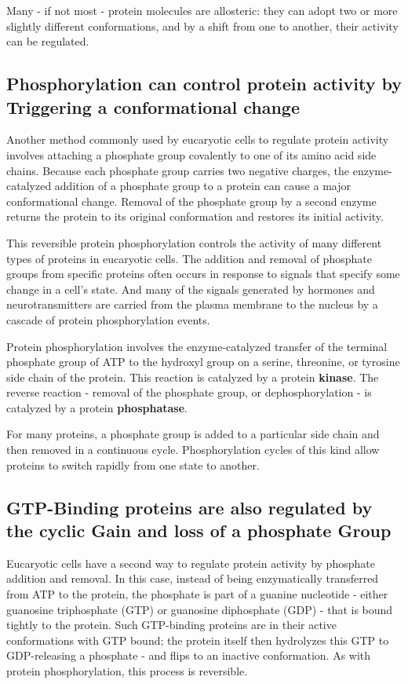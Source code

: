 Many - if not most - protein molecules are allosteric: they can adopt
two or more slightly different conformations, and by a shift from one to
another, their activity can be regulated.

\subsection{Phosphorylation can control protein activity by Triggering a conformational change}

Another method commonly used by eucaryotic cells to regulate protein
activity involves attaching a phosphate group covalently to one of
its amino acid side chains. Because each phosphate group carries two
negative charges, the enzyme-catalyzed addition of a phosphate group
to a protein can cause a major conformational change.
Removal of the phosphate group by a second enzyme returns the protein to its original
conformation and restores its initial activity.

This reversible protein phosphorylation controls the activity of many
different types of proteins in eucaryotic cells.
The addition and removal of phosphate groups from specific proteins
often occurs in response to signals that specify some change in a cell’s
state. And many of the signals generated by hormones and neurotransmitters are
carried from the plasma membrane to the nucleus by a cascade of protein
phosphorylation events.

Protein phosphorylation involves the enzyme-catalyzed transfer of the
terminal phosphate group of ATP to the hydroxyl group on a serine, threonine,
or tyrosine side chain of the protein. This reaction is catalyzed by a
protein \textbf{kinase}. The reverse reaction - removal of the phosphate group,
or dephosphorylation - is catalyzed by a protein \textbf{phosphatase}.

For many proteins, a phosphate group is added to a particular side
chain and then removed in a continuous cycle. Phosphorylation cycles
of this kind allow proteins to switch rapidly from one state to another.

\subsection{GTP-Binding proteins are also regulated by the cyclic Gain and loss of a phosphate Group}

Eucaryotic cells have a second way to regulate protein activity by phosphate
addition and removal. In this case, instead of being enzymatically
transferred from ATP to the protein, the phosphate is part of a guanine
nucleotide - either guanosine triphosphate (GTP) or guanosine diphosphate
(GDP) - that is bound tightly to the protein. Such GTP-binding
proteins are in their active conformations with GTP bound; the protein
itself then hydrolyzes this GTP to GDP-releasing a phosphate - and flips
to an inactive conformation. As with protein phosphorylation, this process is reversible.

